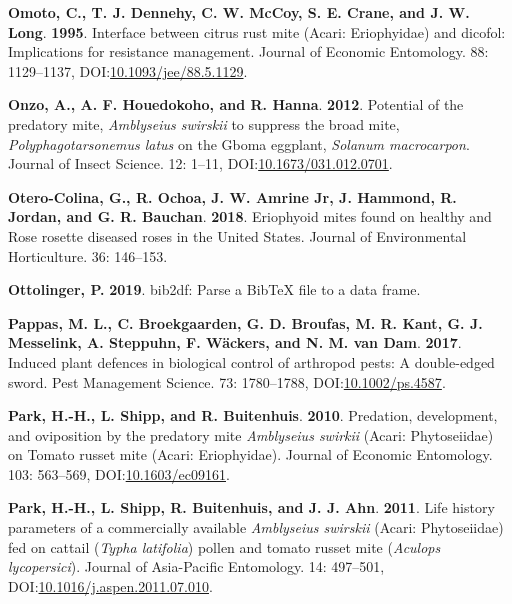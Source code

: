 \documentclass[12pt,final,CPage]{ufthesis}
\newlength{\cslhangindent}
\newenvironment{CSLReferences}[2] %
{%
	\setlength{\parindent}{0pt}
	\ifodd #1 \everypar{\setlength{\hangindent}{\cslhangindent}}\ignorespaces\fi
	\ifnum #2 > 0
	\setlength{\parskip}{#2\baselineskip}
	\fi
}%
{}
\begin{document}
{\begin{CSLReferences}{1}{0}
  \leavevmode{}%
  \textbf{Omoto, C., T. J. Dennehy, C. W. McCoy, S. E. Crane, and J. W. Long}. \textbf{1995}. Interface between citrus rust mite ({Acari}: {Eriophyidae}) and dicofol: Implications for resistance management. Journal of Economic Entomology. 88: 1129--1137, DOI:\href{https://doi.org/10.1093/jee/88.5.1129}{10.1093/jee/88.5.1129}.

  \leavevmode{}%
  \textbf{Onzo, A., A. F. Houedokoho, and R. Hanna}. \textbf{2012}. Potential of the predatory mite, {\emph{Amblyseius swirskii}} to suppress the broad mite, {\emph{Polyphagotarsonemus latus}} on the {Gboma eggplant}, {\emph{Solanum macrocarpon}}. Journal of Insect Science. 12: 1--11, DOI:\href{https://doi.org/10.1673/031.012.0701}{10.1673/031.012.0701}.

  \leavevmode{}%
  \textbf{Otero-Colina, G., R. Ochoa, J. W. Amrine Jr, J. Hammond, R. Jordan, and G. R. Bauchan}. \textbf{2018}. Eriophyoid mites found on healthy and {Rose rosette diseased} roses in the {United States}. Journal of Environmental Horticulture. 36: 146--153.

  \leavevmode{}%
  \textbf{Ottolinger, P.} \textbf{2019}. {bib2df}: Parse a {BibTeX} file to a data frame.

  \leavevmode{}%
  \textbf{Pappas, M. L., C. Broekgaarden, G. D. Broufas, M. R. Kant, G. J. Messelink, A. Steppuhn, F. Wäckers, and N. M. van Dam}. \textbf{2017}. Induced plant defences in biological control of arthropod pests: A double-edged sword. Pest Management Science. 73: 1780--1788, DOI:\href{https://doi.org/10.1002/ps.4587}{10.1002/ps.4587}.

  \leavevmode{}%
  \textbf{Park, H.-H., L. Shipp, and R. Buitenhuis}. \textbf{2010}. Predation, development, and oviposition by the predatory mite {\emph{Amblyseius swirkii}} ({Acari}: {Phytoseiidae}) on {Tomato russet mite} ({Acari}: {Eriophyidae}). Journal of Economic Entomology. 103: 563--569, DOI:\href{https://doi.org/10.1603/ec09161}{10.1603/ec09161}.

  \leavevmode{}%
  \textbf{Park, H.-H., L. Shipp, R. Buitenhuis, and J. J. Ahn}. \textbf{2011}. Life history parameters of a commercially available {\emph{Amblyseius swirskii}} ({Acari}: {Phytoseiidae}) fed on cattail ({\emph{Typha latifolia}}) pollen and tomato russet mite ({\emph{Aculops lycopersici}}). Journal of Asia-Pacific Entomology. 14: 497--501, DOI:\href{https://doi.org/10.1016/j.aspen.2011.07.010}{10.1016/j.aspen.2011.07.010}.


\end{CSLReferences}}
\end{document}
